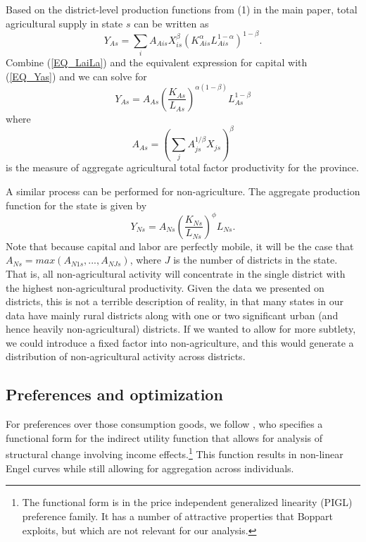 \documentclass[11pt]{article}
\begin{document}
Based on the district-level production functions from (1) in the main paper, total agricultural supply in state $s$ can be written as
\begin{equation}
Y_{As} = \sum_{i} A_{Ais} X_{is}^{\beta} \left(K_{Ais}^{\alpha}L_{Ais}^{1-\alpha}\right)^{1-\beta}. \label{EQ_Yas}
\end{equation}
Combine (\ref{EQ_LaiLa}) and the equivalent expression for capital with (\ref{EQ_Yas}) and we can solve for
\begin{equation}
    Y_{As} = A_{As} \left(\frac{K_{As}}{L_{As}}\right)^{\alpha(1-\beta)} L_{As}^{1-\beta} \label{EQ_YA}
\end{equation}
where 
\begin{equation}
    A_{As} = \left(\sum_{j} A_{js}^{1/\beta}X_{js} \right)^\beta \nonumber
\end{equation}
is the measure of aggregate agricultural total factor productivity for the province.

A similar process can be performed for non-agriculture. The aggregate production function for the state is given by
\begin{equation}
    Y_{Ns} = A_{Ns} \left(\frac{K_{Ns}}{L_{Ns}}\right)^{\phi} L_{Ns}. \label{EQ_YN}
\end{equation}
Note that because capital and labor are perfectly mobile, it will be the case that $A_{Ns} = max(A_{N1s},...,A_{NJs})$, where $J$ is the number of districts in the state. That is, all non-agricultural activity will concentrate in the single district with the highest non-agricultural productivity. Given the data we presented on districts, this is not a terrible description of reality, in that many states in our data have mainly rural districts along with one or two significant urban (and hence heavily non-agricultural) districts. If we wanted to allow for more subtlety, we could introduce a fixed factor into non-agriculture, and this would generate a distribution of non-agricultural activity across districts.

\subsection{Preferences and optimization}
For preferences over those consumption goods, we follow \cite{boppart2014}, who specifies a functional form for the indirect utility function that allows for analysis of structural change involving income effects.\footnote{The functional form is in the price independent generalized linearity (PIGL) preference family. It has a number of attractive properties that Boppart exploits, but which are not relevant for our analysis.} This function results in non-linear Engel curves while still allowing for aggregation across individuals. 
\end{document}

